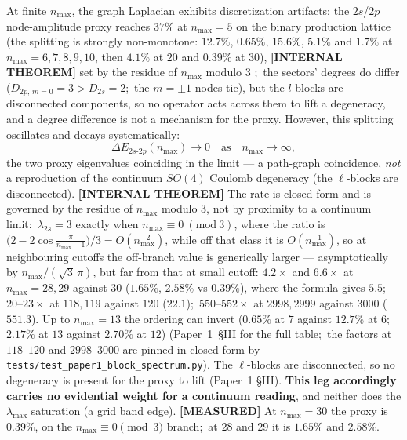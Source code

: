 \documentclass[aps,pra,twocolumn,superscriptaddress,longbibliography]{revtex4-2}
\begin{document}
At finite $n_{\max}$, the graph Laplacian exhibits discretization artifacts: the $2s$/$2p$ node-amplitude proxy reaches $37\%$ at $n_{\max} = 5$ on the binary production lattice (the splitting is strongly non-monotone: $12.7\%$, $0.65\%$, $15.6\%$, $5.1\%$ and $1.7\%$ at $n_{\max} = 6, 7, 8, 9, 10$, then $4.1\%$ at $20$ and $0.39\%$ at $30$), \textbf{[INTERNAL THEOREM]} set by the residue of $n_{\max}$ modulo $3$ \cite{loutey_paper1};\ the sectors' degrees do differ ($D_{2p,\,m=0} = 3 > D_{2s} = 2$;\ the $m = \pm1$ nodes tie), but the $l$-blocks are disconnected components, so no operator acts across them to lift a degeneracy, and a degree difference is not a mechanism for the proxy. However, this splitting oscillates and decays systematically:
\begin{equation}
\Delta E_{2s\text{-}2p}(n_{\max}) \to 0 \quad \text{as} \quad n_{\max} \to \infty,
\end{equation}
the two proxy eigenvalues coinciding in the limit --- a path-graph coincidence, \emph{not} a reproduction of the continuum $SO(4)$ Coulomb degeneracy (the $\ell$-blocks are disconnected).  \textbf{[INTERNAL THEOREM]} The rate is closed form and is governed by the residue of $n_{\max}$ modulo $3$, not by proximity to a continuum limit:\ $\lambda_{2s} = 3$ exactly when $n_{\max} \equiv 0 \ (\mathrm{mod}\ 3)$, where the ratio is $\bigl(2-2\cos\frac{\pi}{n_{\max}-1}\bigr)/3 = O(n_{\max}^{-2})$, while off that class it is $O(n_{\max}^{-1})$, so at neighbouring cutoffs the off-branch value is generically larger --- asymptotically by $n_{\max}/(\sqrt{3}\,\pi)$, but far from that at small cutoff: $4.2\times$ and $6.6\times$ at $n_{\max} = 28, 29$ against $30$ ($1.65\%$, $2.58\%$ vs $0.39\%$), where the formula gives $5.5$;\ $20$--$23\times$ at $118, 119$ against $120$ ($22.1$);\ $550$--$552\times$ at $2998, 2999$ against $3000$ ($551.3$). Up to $n_{\max} = 13$ the ordering can invert ($0.65\%$ at $7$ against $12.7\%$ at $6$;\ $2.17\%$ at $13$ against $2.70\%$ at $12$) (Paper~1~\S III for the full table;\ the factors at $118$--$120$ and $2998$--$3000$ are pinned in closed form by \texttt{tests/test\_paper1\_block\_spectrum.py}).  The $\ell$-blocks are disconnected, so no degeneracy is present for the proxy to lift (Paper~1 \S III).  \textbf{This leg accordingly carries no evidential weight for a continuum reading}, and neither does the $\lambda_{\max}$ saturation (a grid band edge). \textbf{[MEASURED]} At $n_{\max} = 30$ the proxy is $0.39\%$, on the $n_{\max} \equiv 0 \pmod 3$ branch;\ at $28$ and $29$ it is $1.65\%$ and $2.58\%$.
\end{document}

